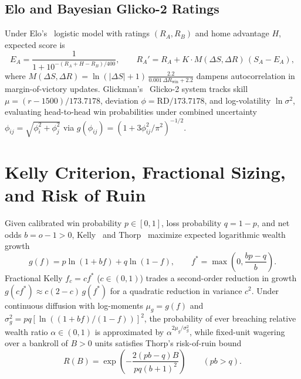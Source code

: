 \documentclass{article}
\begin{document}
\subsection{Elo and Bayesian Glicko-2 Ratings}
Under Elo's~\cite{elo1978rating} logistic model with ratings $(R_A, R_B)$ and home advantage $H$, expected score is
\begin{equation}
E_A = \frac{1}{1 + 10^{-(R_A + H - R_B)/400}}, \qquad R_A' = R_A + K \cdot M(\Delta S, \Delta R)\,(S_A - E_A),
\end{equation}
where $M(\Delta S, \Delta R) = \ln(|\Delta S| + 1)\,\frac{2.2}{0.001\,\Delta R_{\text{win}} + 2.2}$ dampens autocorrelation in margin-of-victory updates. Glickman's~\cite{glickman1999parameter} Glicko-2 system tracks skill $\mu = (r - 1500)/173.7178$, deviation $\phi = \mathrm{RD}/173.7178$, and log-volatility $\ln \sigma^2$, evaluating head-to-head win probabilities under combined uncertainty $\phi_{ij} = \sqrt{\phi_i^2 + \phi_j^2}$ via $g(\phi_{ij}) = (1 + 3\phi_{ij}^2 / \pi^2)^{-1/2}$.

\section{Kelly Criterion, Fractional Sizing, and Risk of Ruin}
Given calibrated win probability $p \in [0, 1]$, loss probability $q = 1 - p$, and net odds $b = o - 1 > 0$, Kelly~\cite{kelly1956new} and Thorp~\cite{thorp1969optimal} maximize expected logarithmic wealth growth
\begin{equation}
g(f) = p \ln(1 + b f) + q \ln(1 - f), \qquad f^* = \max\!\left(0, \frac{b p - q}{b}\right).
\end{equation}
Fractional Kelly $f_c = c f^*$ ($c \in (0, 1)$) trades a second-order reduction in growth $g(c f^*) \approx c(2 - c)\,g(f^*)$ for a quadratic reduction in variance $c^2$. Under continuous diffusion with log-moments $\mu_g = g(f)$ and $\sigma_g^2 = p q [\ln((1 + bf)/(1 - f))]^2$, the probability of ever breaching relative wealth ratio $\alpha \in (0, 1)$ is approximated by $\alpha^{2\mu_g / \sigma_g^2}$, while fixed-unit wagering over a bankroll of $B > 0$ units satisfies Thorp's risk-of-ruin bound
\begin{equation}
R(B) = \exp\!\left(-\frac{2(p b - q) B}{p q (b + 1)^2}\right) \qquad (p b > q).
\end{equation}



\end{document}
